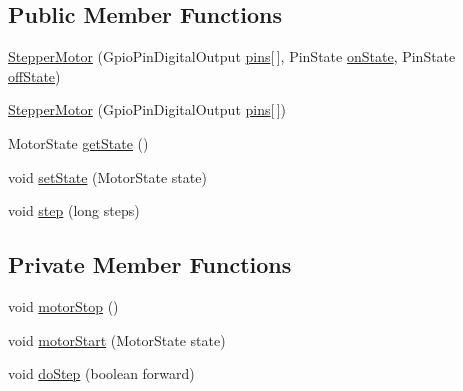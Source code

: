 \subsection*{Public Member Functions}
\begin{DoxyCompactItemize}
\item 
\hyperlink{classcom_1_1libsensorj_1_1concreteactuator_1_1StepperMotor_a8b5f85a0849fd8de39b415e5cb2903ba}{Stepper\+Motor} (Gpio\+Pin\+Digital\+Output \hyperlink{classcom_1_1libsensorj_1_1concreteactuator_1_1StepperMotor_aefca907f907fd398b7bcdd902e04b928}{pins}\mbox{[}$\,$\mbox{]}, Pin\+State \hyperlink{classcom_1_1libsensorj_1_1concreteactuator_1_1StepperMotor_abcf0537132ae7308214b40125aaeef27}{on\+State}, Pin\+State \hyperlink{classcom_1_1libsensorj_1_1concreteactuator_1_1StepperMotor_a44204d0df9f310e95185bea229c1d23d}{off\+State})
\item 
\hyperlink{classcom_1_1libsensorj_1_1concreteactuator_1_1StepperMotor_a9ac4472f2583dd20460992528a0ca370}{Stepper\+Motor} (Gpio\+Pin\+Digital\+Output \hyperlink{classcom_1_1libsensorj_1_1concreteactuator_1_1StepperMotor_aefca907f907fd398b7bcdd902e04b928}{pins}\mbox{[}$\,$\mbox{]})
\item 
Motor\+State \hyperlink{classcom_1_1libsensorj_1_1concreteactuator_1_1StepperMotor_a589071fa722a01fd7baf7a0133038c74}{get\+State} ()
\item 
void \hyperlink{classcom_1_1libsensorj_1_1concreteactuator_1_1StepperMotor_a683524a2de1c7e967bc89486f9b9164b}{set\+State} (Motor\+State state)
\item 
void \hyperlink{classcom_1_1libsensorj_1_1concreteactuator_1_1StepperMotor_a957195aa23742bd32033d58437e71835}{step} (long steps)
\end{DoxyCompactItemize}
\subsection*{Private Member Functions}
\begin{DoxyCompactItemize}
\item 
void \hyperlink{classcom_1_1libsensorj_1_1concreteactuator_1_1StepperMotor_a063d16fae6c8b67b14efd441a05dbfd6}{motor\+Stop} ()
\item 
void \hyperlink{classcom_1_1libsensorj_1_1concreteactuator_1_1StepperMotor_a8e8e397c042af5e2b00f909de199acd1}{motor\+Start} (Motor\+State state)
\item 
void \hyperlink{classcom_1_1libsensorj_1_1concreteactuator_1_1StepperMotor_a70da2be5b98bdcd51b1098cbef0525f1}{do\+Step} (boolean forward)
\end{DoxyCompactItemize}
